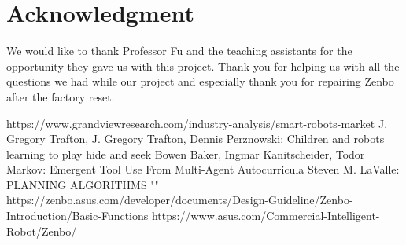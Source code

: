 \documentclass[conference]{IEEEtran}
\begin{document}
\section*{Acknowledgment}
We would like to thank Professor Fu and the teaching assistants for the opportunity they gave us with this project.
Thank you for helping us with all the questions we had while our project and especially thank you for repairing Zenbo after the factory reset.\\
\begin{thebibliography}{00}
	 https://www.grandviewresearch.com/industry-analysis/smart-robots-market
	 J. Gregory Trafton, J. Gregory Trafton, Dennis Perznowski: Children and robots learning to play hide and seek
	 Bowen Baker, Ingmar Kanitscheider, Todor Markov: Emergent Tool Use From Multi-Agent Autocurricula
	 Steven M. LaValle: PLANNING ALGORITHMS
	  ""
	 https://zenbo.asus.com/developer/documents/Design-Guideline/Zenbo-Introduction/Basic-Functions
	 https://www.asus.com/Commercial-Intelligent-Robot/Zenbo/
\end{thebibliography}
\vspace{12pt}
\end{document}
